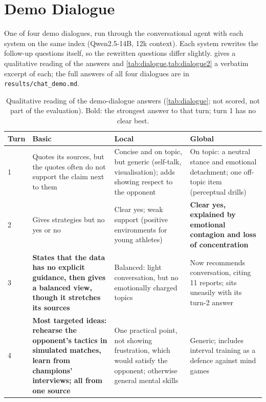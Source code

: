 \documentclass{article}
\begin{document}
\clearpage
\makeatletter\setlength{\@fptop}{0pt}\makeatother
\section{Demo Dialogue}
\label{app:dialogue}
One of four demo dialogues, run through the conversational agent with each system on the same index
(Qwen2.5-14B, 12k context). Each system rewrites the follow-up questions itself, so the rewritten
questions differ slightly.  gives a qualitative reading of the answers and
\cref{tab:dialogue,tab:dialogue2} a verbatim excerpt of each; the full answers of all four dialogues are in
\texttt{results/chat\_demo.md}.

\begin{table}[!ht]
\caption{Qualitative reading of the demo-dialogue answers (\cref{tab:dialogue}; not scored, not part of the
evaluation). Bold: the strongest answer to that turn; turn 1 has no clear best.}
\label{tab:dialoguereading}
\vskip 0.05in
\begin{center}\begin{footnotesize}
\begin{tabular}{p{}p{}p{}p{}}
\toprule
Turn & Basic & Local & Global \\
\midrule
1 & Quotes its sources, but the quotes often do not support the claim next to them
  & Concise and on topic, but generic (self-talk, visualisation); adds showing respect to the opponent
  & On topic: a neutral stance and emotional detachment; one off-topic item (perceptual drills) \\[2pt]
2 & Gives strategies but no yes or no
  & Clear yes; weak support (positive environments for young athletes)
  & \textbf{Clear yes, explained by emotional contagion and loss of concentration} \\[2pt]
3 & \textbf{States that the data has no explicit guidance, then gives a balanced view, though it stretches its sources}
  & Balanced: light conversation, but no emotionally charged topics
  & Now recommends conversation, citing 11 reports; sits uneasily with its turn-2 answer \\[2pt]
4 & \textbf{Most targeted ideas: rehearse the opponent's tactics in simulated matches, learn from champions' interviews; all from one source}
  & One practical point, not showing frustration, which would satisfy the opponent; otherwise general mental skills
  & Generic; includes interval training as a defence against mind games \\
\bottomrule
\end{tabular}
\end{footnotesize}\end{center}
\end{table}
\end{document}
